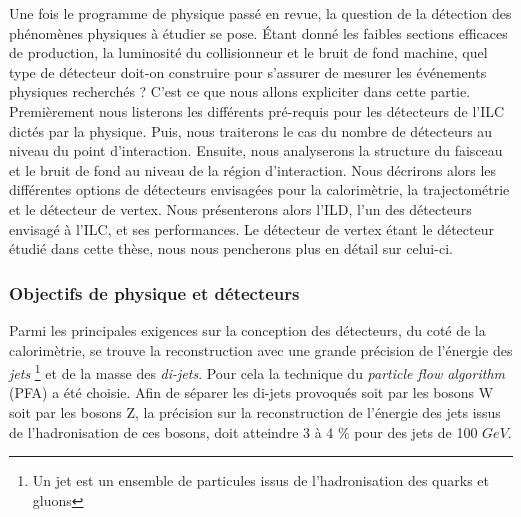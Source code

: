   
  
  Une fois le programme de physique pass\'e en revue, la question de la d\'etection des ph\'enom\`enes physiques \`a \'etudier se pose. Étant donn\'e les faibles sections efficaces de production, la luminosit\'e du collisionneur et le bruit de fond machine, quel type de d\'etecteur doit-on construire pour s'assurer de mesurer les \'ev\'enements physiques recherch\'es ? C'est ce que nous allons expliciter dans cette partie. Premi\`erement nous listerons les diff\'erents pr\'e-requis pour les d\'etecteurs de l'ILC dict\'es par la physique. Puis, nous traiterons le cas du nombre de d\'etecteurs au niveau du point d'interaction. Ensuite, nous analyserons la structure du faisceau et le bruit de fond au niveau de la r\'egion d'interaction. Nous d\'ecrirons alors les diff\'erentes options de d\'etecteurs envisag\'ees pour la calorim\`etrie, la trajectom\'etrie et le d\'etecteur de vertex. Nous pr\'esenterons alors l'ILD, l'un des d\'etecteurs envisag\'e \`a l'ILC, et ses performances. Le d\'etecteur de vertex \'etant le d\'etecteur \'etudi\'e dans cette th\`ese, nous nous pencherons plus en d\'etail sur celui-ci.
  
  
  \subsubsection{Objectifs de physique et d\'etecteurs}
  
  Parmi les principales exigences sur la conception des d\'etecteurs, du cot\'e de la calorim\`etrie, se trouve la reconstruction avec une grande pr\'ecision de l'\'energie des \textit{jets} \footnote{Un jet est un ensemble de particules issus de l'hadronisation des quarks et gluons} et de la masse des \textit{di-jets}. Pour cela la technique du \textit{particle flow algorithm} (PFA) a \'et\'e choisie. Afin de s\'eparer les di-jets provoqu\'es soit par les bosons W soit par les bosons Z, la pr\'ecision sur la reconstruction de l'\'energie des jets issus de l'hadronisation de ces bosons, doit atteindre 3 \`a 4 $\%$ pour des jets de 100 $GeV$. 
  
